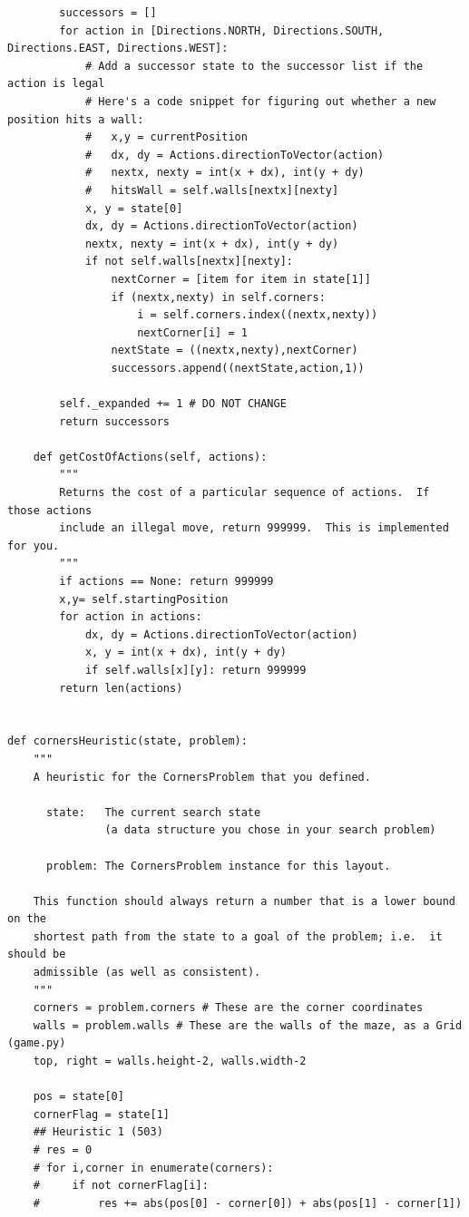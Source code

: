 \documentclass[a4paper, 11pt]{article}
\begin{document}
\begin{lstlisting}
        successors = []
        for action in [Directions.NORTH, Directions.SOUTH, Directions.EAST, Directions.WEST]:
            # Add a successor state to the successor list if the action is legal
            # Here's a code snippet for figuring out whether a new position hits a wall:
            #   x,y = currentPosition
            #   dx, dy = Actions.directionToVector(action)
            #   nextx, nexty = int(x + dx), int(y + dy)
            #   hitsWall = self.walls[nextx][nexty]
            x, y = state[0]
            dx, dy = Actions.directionToVector(action)
            nextx, nexty = int(x + dx), int(y + dy)
            if not self.walls[nextx][nexty]:
                nextCorner = [item for item in state[1]]
                if (nextx,nexty) in self.corners:
                    i = self.corners.index((nextx,nexty))
                    nextCorner[i] = 1
                nextState = ((nextx,nexty),nextCorner)
                successors.append((nextState,action,1))

        self._expanded += 1 # DO NOT CHANGE
        return successors

    def getCostOfActions(self, actions):
        """
        Returns the cost of a particular sequence of actions.  If those actions
        include an illegal move, return 999999.  This is implemented for you.
        """
        if actions == None: return 999999
        x,y= self.startingPosition
        for action in actions:
            dx, dy = Actions.directionToVector(action)
            x, y = int(x + dx), int(y + dy)
            if self.walls[x][y]: return 999999
        return len(actions)


def cornersHeuristic(state, problem):
    """
    A heuristic for the CornersProblem that you defined.

      state:   The current search state
               (a data structure you chose in your search problem)

      problem: The CornersProblem instance for this layout.

    This function should always return a number that is a lower bound on the
    shortest path from the state to a goal of the problem; i.e.  it should be
    admissible (as well as consistent).
    """
    corners = problem.corners # These are the corner coordinates
    walls = problem.walls # These are the walls of the maze, as a Grid (game.py)
    top, right = walls.height-2, walls.width-2

    pos = state[0]
    cornerFlag = state[1]
    ## Heuristic 1 (503)
    # res = 0
    # for i,corner in enumerate(corners):
    #     if not cornerFlag[i]:
    #         res += abs(pos[0] - corner[0]) + abs(pos[1] - corner[1])


\end{lstlisting}
\end{document}
